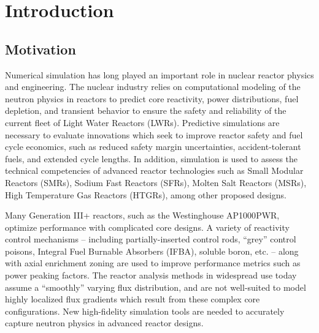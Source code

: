 \chapter{Introduction}
\label{chap:intro}

\section{Motivation}
\label{sec:chap1-motivation}


Numerical simulation has long played an important role in nuclear reactor physics and engineering. The nuclear industry relies on computational modeling of the neutron physics in reactors to predict core reactivity, power distributions, fuel depletion, and transient behavior to ensure the safety and reliability of the current fleet of Light Water Reactors (LWRs). Predictive simulations are necessary to evaluate innovations which seek to improve reactor safety and fuel cycle economics, such as reduced safety margin uncertainties, accident-tolerant fuels, and extended cycle lengths. In addition, simulation is used to assess the technical competencies of advanced reactor technologies such as Small Modular Reactors (SMRs), Sodium Fast Reactors (SFRs), Molten Salt Reactors (MSRs), High Temperature Gas Reactors (HTGRs), among other proposed designs. 

Many Generation III+ reactors, such as the Westinghouse AP1000\texttrademark \ac{PWR}, optimize performance with complicated core designs. A variety of reactivity control mechanisms -- including partially-inserted control rods, ``grey'' control poisons, Integral Fuel Burnable Absorbers (IFBA), soluble boron, etc. -- along with axial enrichment zoning are used to improve performance metrics such as power peaking factors. The reactor analysis methods in widespread use today assume a ``smoothly'' varying flux distribution, and are not well-suited to model highly localized flux gradients which result from these complex core configurations. New high-fidelity simulation tools are needed to accurately capture neutron physics in advanced reactor designs.

